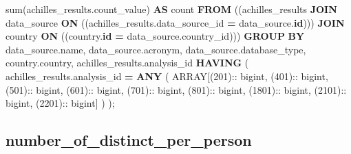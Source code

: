 \documentclass[
]{book}
\newenvironment{Shaded}{\begin{snugshade}}{\end{snugshade}}
\newcommand{\DataTypeTok}[1]{\textcolor[rgb]{0.13,0.29,0.53}{#1}}
\newcommand{\DecValTok}[1]{\textcolor[rgb]{0.00,0.00,0.81}{#1}}
\newcommand{\FunctionTok}[1]{\textcolor[rgb]{0.00,0.00,0.00}{#1}}
\newcommand{\KeywordTok}[1]{\textcolor[rgb]{0.13,0.29,0.53}{\textbf{#1}}}
\newcommand{\NormalTok}[1]{#1}
\newcommand{\OperatorTok}[1]{\textcolor[rgb]{0.81,0.36,0.00}{\textbf{#1}}}
\begin{document}
\begin{Shaded}
\begin{Highlighting}[]
   \FunctionTok{sum}\NormalTok{(achilles\_results.count\_value) }\KeywordTok{AS} \FunctionTok{count}
  \KeywordTok{FROM}\NormalTok{ ((achilles\_results}
    \KeywordTok{JOIN}\NormalTok{ data\_source}
      \KeywordTok{ON}\NormalTok{ ((achilles\_results.data\_source\_id }\OperatorTok{=}\NormalTok{ data\_source.}\KeywordTok{id}\NormalTok{)))}
    \KeywordTok{JOIN}\NormalTok{ country }\KeywordTok{ON}\NormalTok{ ((country.}\KeywordTok{id} \OperatorTok{=}\NormalTok{ data\_source.country\_id)))}
 \KeywordTok{GROUP} \KeywordTok{BY}
\NormalTok{   data\_source.name,}
\NormalTok{   data\_source.acronym,}
\NormalTok{   data\_source.database\_type,}
\NormalTok{   country.country,}
\NormalTok{   achilles\_results.analysis\_id}
\KeywordTok{HAVING}
\NormalTok{  (}
\NormalTok{    achilles\_results.analysis\_id }\OperatorTok{=} \KeywordTok{ANY}\NormalTok{ (}
      \DataTypeTok{ARRAY}\NormalTok{[(}\DecValTok{201}\NormalTok{):: bigint,}
\NormalTok{      (}\DecValTok{401}\NormalTok{):: bigint,}
\NormalTok{      (}\DecValTok{501}\NormalTok{):: bigint,}
\NormalTok{      (}\DecValTok{601}\NormalTok{):: bigint,}
\NormalTok{      (}\DecValTok{701}\NormalTok{):: bigint,}
\NormalTok{      (}\DecValTok{801}\NormalTok{):: bigint,}
\NormalTok{      (}\DecValTok{1801}\NormalTok{):: bigint,}
\NormalTok{      (}\DecValTok{2101}\NormalTok{):: bigint,}
\NormalTok{      (}\DecValTok{2201}\NormalTok{):: bigint]}
\NormalTok{    )}
\NormalTok{  );}
\end{Highlighting}
\end{Shaded}

\hypertarget{number_of_distinct_per_person}{%
\subsection*{number\_of\_distinct\_per\_person}\label{number_of_distinct_per_person}}
\end{document}
